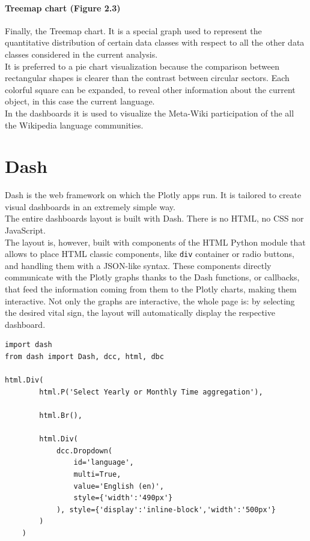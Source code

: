 \paragraph{Treemap chart (Figure 2.3)}
Finally, the Treemap chart. It is a special graph used to represent the quantitative distribution of certain data classes with respect to all the other data classes considered in the current analysis. \\It is preferred to a pie chart visualization because the comparison between rectangular shapes is clearer than the contrast between circular sectors. Each colorful square can be expanded, to reveal other information about the current object, in this case the current language.\cite{treemap}\\
In the dashboards it is used to visualize the Meta-Wiki participation of the all the Wikipedia language communities.

\section{Dash}
\label{sec:dash}

Dash is the web framework on which the Plotly apps run. It is tailored to create visual dashboards in an extremely simple way. \cite{dash}\\
The entire dashboards layout is built with Dash. There is no HTML, no CSS nor JavaScript.\\
The layout is, however, built with components of the HTML Python module that allows to place HTML classic components, like \verb#div# container or radio buttons, and handling them with a JSON-like syntax. These components directly communicate with the Plotly graphs thanks to the Dash functions, or callbacks, that feed the information coming from them to the Plotly charts, making them interactive. Not only the graphs are interactive, the whole page is: by selecting the desired vital sign, the layout will automatically display the respective dashboard.

\lstset{frame=lines}
\lstset{basicstyle=\footnotesize}
\lstset{caption=Structuring the Dash layout}
\begin{lstlisting}
import dash
from dash import Dash, dcc, html, dbc

html.Div(
        html.P('Select Yearly or Monthly Time aggregation'),
        
        html.Br(),
        
        html.Div(
            dcc.Dropdown(
                id='language',
                multi=True,
                value='English (en)',
                style={'width':'490px'}
            ), style={'display':'inline-block','width':'500px'}
        )
    )
    
\end{lstlisting}

